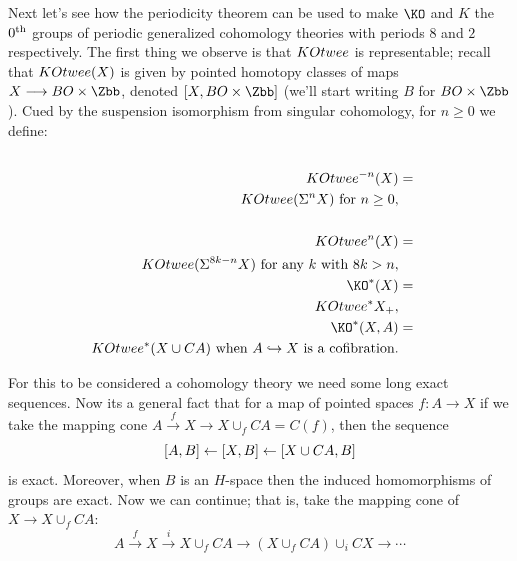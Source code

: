 Next let's see how the periodicity theorem can be used to make $\KO$ and $K$ the $0^\textup{th}$ groups of periodic generalized cohomology theories with periods $8$ and $2$ respectively.  The first thing we observe is that $\\KOtwee$ is representable; recall that $\\KOtwee(X)$ is given by pointed homotopy classes of maps $X \to BO \times \Zbb$, denoted $[X, BO \times \Zbb]$ (we'll start writing $B$ for $BO \times \Zbb$).  Cued by the suspension isomorphism from singular cohomology, for $n \ge 0$ we define:
\begin{align*}
\qquad\qquad\qquad
\\KOtwee^{-n} (X) & = \\KOtwee(\Suspend^n X)\hbox{\ for $n\geq0$}, \\
\\KOtwee^n(X) & = \\KOtwee(\Suspend^{8k-n}X) \hbox{\ for any $k$ with $8k > n$}, \\
\KO^*(X) &= \\KOtwee^* X_+, \\
\KO^*(X, A) & = \\KOtwee^*(X \cup CA) \textup{\ when $A\hookrightarrow X$ is a cofibration.}
\end{align*}

For this to be considered a cohomology theory we need some long exact sequences.  Now its a general fact that for a map of pointed spaces $f: A \to X$ if we take the mapping cone $A \stackrel{f}{\to} X \to X \cup_f CA = C(f)$, then the sequence
\[
[A, B] \leftarrow [X, B] \leftarrow [X \cup CA, B]
\]
is exact.  Moreover, when $B$ is an $H$-space then the induced homomorphisms of groups are exact.  Now we can continue; that is, take the mapping cone of $X \to X \cup_f CA$:
\[
A \stackrel{f}{\to} X \stackrel{i}{\to} X \cup_f CA \to (X \cup_f CA) \cup_i CX \to \cdots
\]

